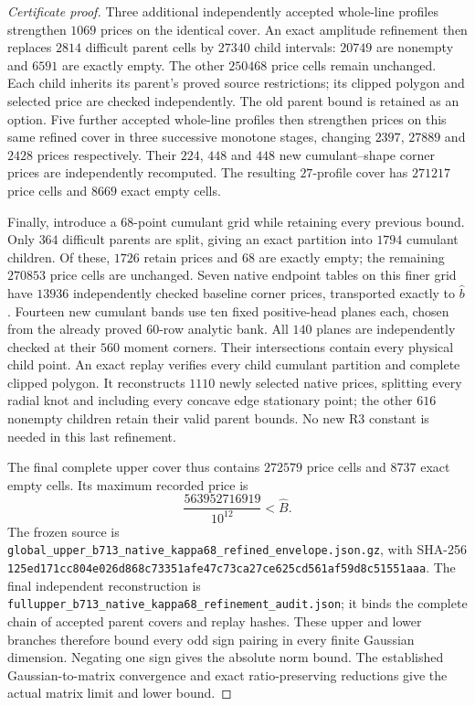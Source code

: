 \begin{proof}[Certificate proof]
Three additional independently accepted whole-line profiles strengthen
$1069$ prices on the identical cover. An exact amplitude refinement
then replaces $2814$ difficult parent cells by $27340$ child intervals:
$20749$ are nonempty and $6591$ are exactly empty. The other $250468$
price cells remain unchanged. Each child inherits its parent's proved
source restrictions; its clipped polygon and selected price are checked
independently. The old parent bound is retained as an option. Five
further accepted whole-line profiles then strengthen prices on this
same refined cover in three successive monotone stages, changing
$2397$, $27889$ and $2428$ prices respectively. Their $224$, $448$ and
$448$ new cumulant--shape corner prices are independently recomputed.
The resulting $27$-profile cover has $271217$ price cells and $8669$
exact empty cells.

Finally, introduce a $68$-point cumulant grid while retaining every
previous bound. Only $364$ difficult parents are split, giving an exact
partition into $1794$ cumulant children. Of these, $1726$ retain prices
and $68$ are exactly empty; the remaining $270853$ price cells are
unchanged. Seven native endpoint tables on this finer grid have $13936$
independently checked baseline corner prices, transported exactly to
$\widehat b$. Fourteen new cumulant bands use ten fixed positive-head
planes each, chosen from the already proved $60$-row analytic bank.
All $140$ planes are independently checked at their $560$ moment
corners. Their intersections contain every physical child point.
An exact replay verifies every child cumulant partition and complete
clipped polygon. It reconstructs $1110$ newly selected native prices,
splitting every radial knot and including every concave edge stationary
point; the other $616$ nonempty children retain their valid parent bounds.
No new R3 constant is needed in this last refinement.

The final complete upper cover thus contains $272579$ price cells and
$8737$ exact empty cells. Its maximum recorded price is
\[
 \frac{563952716919}{10^{12}}<\widehat B.
\]
The frozen source is
\texttt{global\_\allowbreak upper\_\allowbreak b713\_\allowbreak native\_\allowbreak kappa68\_\allowbreak refined\_\allowbreak envelope.json.gz},
with SHA-256
\texttt{125ed171cc804e026d868c73351afe47c73ca27ce625cd561af59d8c51551aaa}.
The final independent reconstruction is
\texttt{fullupper\_\allowbreak b713\_\allowbreak native\_\allowbreak kappa68\_\allowbreak refinement\_\allowbreak audit.json};
it binds the complete chain of accepted parent covers and replay hashes.
These upper and lower branches therefore bound every odd sign pairing
in every finite Gaussian dimension. Negating one sign gives the absolute
norm bound. The established Gaussian-to-matrix convergence and exact
ratio-preserving reductions give the actual matrix limit and lower bound.
\end{proof}
